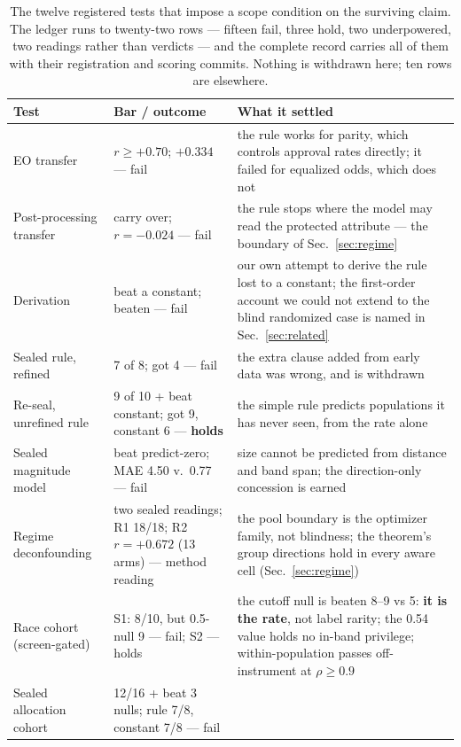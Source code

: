 \documentclass[conference]{IEEEtran}
\begin{document}
\begin{table}[!t]
\caption{The twelve registered tests that impose a scope condition on the surviving claim. The ledger runs to twenty-two rows --- fifteen fail, three hold, two underpowered, two readings rather than verdicts --- and the complete record carries all of them with their registration and scoring commits. Nothing is withdrawn here; ten rows are elsewhere.}
\label{tab:registered}
\centering
\scriptsize
\setlength{\tabcolsep}{3pt}
\begin{tabular}{@{}p{2.35cm}p{1.55cm}p{3.6cm}@{}}
\toprule
\textbf{Test} & \textbf{Bar / outcome} & \textbf{What it settled} \\
\midrule
EO transfer & $r \geq +0.70$; $+0.334$ --- fail & the rule works for parity, which controls
approval rates directly; it failed for equalized odds, which does not \\
Post-processing transfer & carry over; $r = -0.024$ --- fail & the rule stops where the
model may read the protected attribute --- the boundary of Sec.~\ref{sec:regime} \\
Derivation & beat a constant; beaten --- fail & our own attempt to derive the rule lost
to a constant; the first-order account we could not extend to the blind randomized case is
named in Sec.~\ref{sec:related} \\
Sealed rule, refined & 7 of 8; got 4 --- fail & the extra clause added from early data was
wrong, and is withdrawn \\
Re-seal, unrefined rule & 9 of 10 + beat constant; got 9, constant 6 --- \textbf{holds} &
the simple rule predicts populations it has never seen, from the rate alone \\
Sealed magnitude model & beat predict-zero; MAE 4.50 v.\ 0.77 --- fail & size cannot be
predicted from distance and band span; the direction-only concession is earned \\
Regime deconfounding & two sealed readings; R1 18/18; R2 $r=+0.672$ (13 arms) --- method reading &
the pool boundary is the optimizer family, not blindness; the theorem's group
directions hold in every aware cell (Sec.~\ref{sec:regime}) \\
Race cohort (screen-gated) & S1: 8/10, but 0.5-null 9 --- fail; S2 --- holds & the
cutoff null is beaten 8--9 vs 5: \textbf{it is the rate}, not label rarity; the 0.54
value holds no in-band privilege; within-population passes off-instrument at
$\rho \ge 0.9$ \\
Sealed allocation cohort & 12/16 + beat 3 nulls; rule 7/8, constant 7/8 --- fail &

\end{tabular}
\end{table}
\end{document}
